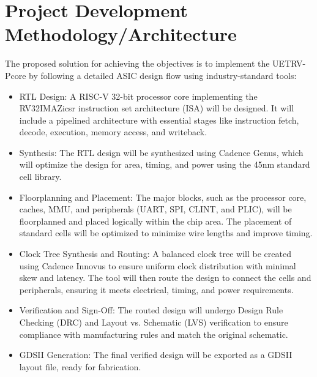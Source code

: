 
\chapter{Project Development Methodology/Architecture}
\label{Chapter5}

The proposed solution for achieving the objectives is to implement the UETRV-Pcore by following a detailed ASIC design flow using industry-standard tools:
\begin{itemize}
    \item RTL Design: A RISC-V 32-bit processor core implementing the RV32IMAZicsr instruction set architecture (ISA) will be designed. It will include a pipelined architecture with essential stages like instruction fetch, decode, execution, memory access, and writeback.
    \item Synthesis: The RTL design will be synthesized using Cadence Genus, which will optimize the design for area, timing, and power using the 45nm standard cell library.
    \item Floorplanning and Placement: The major blocks, such as the processor core, caches, MMU, and peripherals (UART, SPI, CLINT, and PLIC), will be floorplanned and placed logically within the chip area. The placement of standard cells will be optimized to minimize wire lengths and improve timing.
    \item Clock Tree Synthesis and Routing: A balanced clock tree will be created using Cadence Innovus to ensure uniform clock distribution with minimal skew and latency. The tool will then route the design to connect the cells and peripherals, ensuring it meets electrical, timing, and power requirements.
    \item Verification and Sign-Off: The routed design will undergo Design Rule Checking (DRC) and Layout vs. Schematic (LVS) verification to ensure compliance with manufacturing rules and match the original schematic.
    \item GDSII Generation: The final verified design will be exported as a GDSII layout file, ready for fabrication.

\end{itemize}
